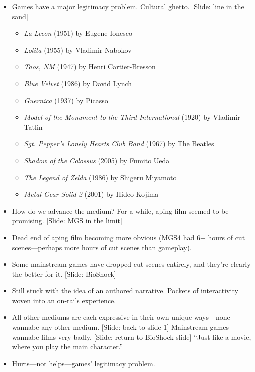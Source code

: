 \documentclass[12pt]{article}
\begin{document}
{\Huge

\begin{itemize}



\item Games have a major legitimacy problem.  Cultural ghetto.  [Slide:  line in the sand] {\large \begin{itemize}
\item {\it La Lecon} (1951) by Eugene Ionesco
\item {\it Lolita} (1955) by Vladimir Nabokov
\item {\it Taos, NM} (1947) by Henri Cartier-Bresson
\item {\it Blue Velvet} (1986) by David Lynch
\item {\it Guernica} (1937) by Picasso
\item {\it Model of the Monument to the Third International} (1920) by Vladimir Tatlin
\item {\it Sgt. Pepper's Lonely Hearts Club Band} (1967) by The Beatles
\item {\it Shadow of the Colossus} (2005) by Fumito Ueda
\item {\it The Legend of Zelda} (1986) by Shigeru Miyamoto
\item {\it Metal Gear Solid 2} (2001) by Hideo Kojima 
\end{itemize} }

\item How do we advance the medium?  For a while, aping film seemed to be promising. [Slide:  MGS in the limit]  

\item Dead end of aping film becoming more obvious (MGS4 had 6+ hours of cut scenes---perhaps more hours of cut scenes than gameplay).

\item Some mainstream games have dropped cut scenes entirely, and they're clearly the better for it. [Slide: BioShock]

\item Still stuck with the idea of an authored narrative.  Pockets of interactivity woven into an on-rails experience.  

\item All other mediums are each expressive in their own unique ways---none wannabe any other medium.  [Slide:  back to slide 1] Mainstream games wannabe films very badly. [Slide:  return to BioShock slide] ``Just like a movie, where you play the main character.''

\item Hurts---not helps---games' legitimacy problem.


\end{itemize}}
\end{document}
